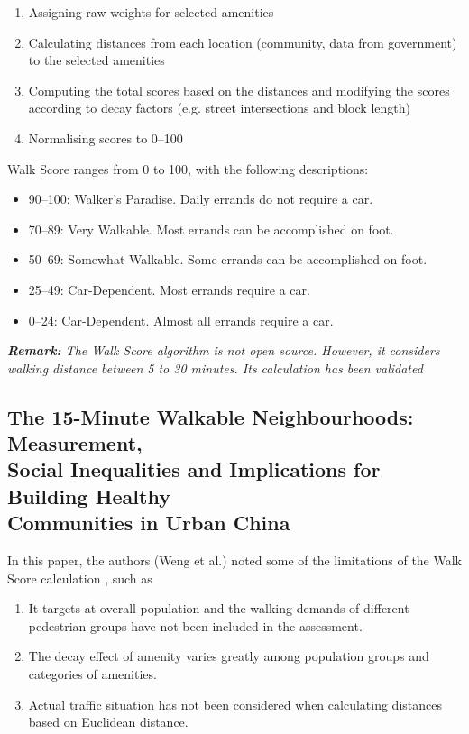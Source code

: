 \begin{enumerate}
    \item Assigning raw weights for selected amenities
    \item Calculating distances from each location (community, data from government) to the selected amenities
    \item Computing the total scores based on the distances and modifying the scores according to decay factors (e.g. street intersections and block length)
    \item Normalising scores to 0–100
\end{enumerate}

Walk Score ranges from 0 to 100, with the following descriptions:

\begin{itemize}
    \item 90–100: Walker's Paradise. Daily errands do not require a car.
    \item 70–89: Very Walkable. Most errands can be accomplished on foot.
    \item 50–69: Somewhat Walkable. Some errands can be accomplished on foot.
    \item 25–49: Car-Dependent. Most errands require a car.
    \item 0–24: Car-Dependent. Almost all errands require a car.
\end{itemize}

\textit{\textbf{Remark:} The Walk Score algorithm is not open source. However, it considers walking distance between 5 to 30 minutes. Its calculation has been validated \cite{carr_validation_2011}}

\subsection{The 15-Minute Walkable Neighbourhoods: Measurement, \\ Social Inequalities and Implications for Building Healthy \\ Communities in Urban China}

In this paper, the authors (Weng et al.) noted some of the limitations of the Walk Score calculation \cite{weng_15-minute_2019}, such as

\begin{enumerate}
    \item It targets at overall population and the walking demands of different pedestrian groups have not been included in the assessment.
    \item The decay effect of amenity varies greatly among population groups and categories of amenities.
    \item Actual traffic situation has not been considered when calculating distances based on Euclidean distance.
\end{enumerate}

